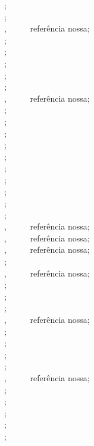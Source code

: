 \begin{apendicesenv}
{\small
	\cite{Alcionep1988} ;\\
	\cite{bart1952} ;\\
	\cite{BibTeX2014} , \ \ \ \ \ referência nossa;\\
	\cite{bioline1998} ;\\
	\cite{birds1998} ;\\
	\cite{cassiano1998} ;\\
	\cite{ceravi1985} ;\\
	\cite{coordena1995} ;\\
	\cite{CTAN2014} , \ \ \ \ \ referência nossa;\\
	\cite{datum1996} ;\\
	\cite{delosmar1997} ;\\
	\cite{drummond1998} ;\\
	\cite{duchamp1918} ;\\
	\cite{espaciais1987} ;\\
	\cite{europa0000} ;\\
	\cite{fagner1988} ;\\
	\cite{gallet1851} ;\\
	\cite{globo1995} ;\\
	\cite{indias0000} ;\\
	\cite{IRL2014} , \ \ \ \ \ referência nossa;\\
	\cite{JabRef2014} , \ \ \ \ \ referência nossa;\\
	\cite{Kile2014} , \ \ \ \ \ referência nossa;\\
	\cite{kobayashi1998} ;\\
	\cite{LaTeX2014} , \ \ \ \ \ referência nossa;\\
	\cite{levi1997} ;\\
	\cite{marinho1995} ;\\
	\cite{mattos1987} ;\\
	\cite{Mendeley2014} , \ \ \ \ \ referência nossa;\\
	\cite{microsoft1995} ;\\
	\cite{mpc1993} ;\\
	\cite{parana1997} ;\\
	\cite{parana1998} ;\\
	\cite{Queiroz2014} , \ \ \ \ \ referência nossa;\\
	\cite{samu1977} ;\\
	\cite{silva1991} ;\\
	\cite{simone1977} ;\\
	\cite{sony1990} ;\\
	\cite{brasil1966} ;\\
}
\end{apendicesenv}
